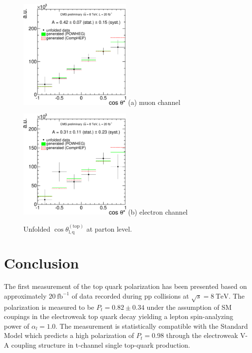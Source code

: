 \documentclass[a4paper]{jpconf}
\newcommand{\unit}[1]{\ensuremath{\mathrm{~#1}}}
\newcommand{\costheta}[0]{\cos\theta_{\mathrm{l,q}}^{\mathrm{(top)}}}
\begin{document}
\begin{figure}[h]
\begin{center}
\begin{minipage}{7cm}
\includegraphics[height=5.5cm]{costheta_unfolded_mu-crop}
\center (a) muon channel
\end{minipage}\hspace{1cm}%
\begin{minipage}{7cm}
\includegraphics[height=5.5cm]{costheta_unfolded_el-crop}
\center (b) electron channel
\end{minipage} 
\caption{\label{fig:unfoldcostheta}Unfolded $\costheta$ at parton level.}
\end{center}
\end{figure}

\section{Conclusion}
The first measurement of the top quark polarization has been presented based on approximately $20\unit{fb^{-1}}$ of data recorded during pp collisions at $\sqrt{s}=8\unit{TeV}$.
The polarization is measured to be $P_{t}=0.82 \pm 0.34$ under the assumption of SM coupings in the electroweak top quark decay yielding a lepton spin-analyzing power of $\alpha_{l}=1.0$. The measurement is statistically compatible with the Standard Model which predicts a high polarization of $P_{t}=0.98$ through the electroweak V-A coupling structure in t-channel single top-quark production.
\end{document}
